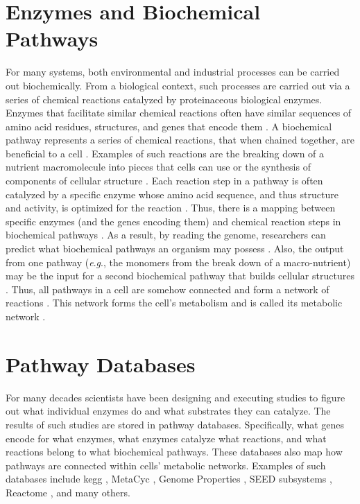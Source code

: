 \section{Enzymes and Biochemical Pathways} \label{enzymes-and-pathways} 

For many systems, both environmental and industrial processes can be carried out 
biochemically. From a biological context, such processes are carried out via a 
series of chemical reactions catalyzed by proteinaceous biological enzymes. 
Enzymes that facilitate similar chemical reactions often have similar sequences 
of amino acid residues, structures, and genes that encode them 
\cite{galperin1998analogous,zhang2003evolution}. A biochemical 
pathway represents a series of chemical reactions, that when chained together, 
are beneficial to a cell \cite{michal2012biochemical}. Examples of such 
reactions are the breaking down of a nutrient macromolecule into pieces that 
cells can use or the synthesis of components of cellular structure 
\cite{wagner2012metabolic}. Each reaction step in a pathway is often 
\cite{keller2015widespread,tawfik2010enzyme} catalyzed by a specific enzyme 
whose amino acid sequence, and thus structure and activity, is optimized for the 
reaction \cite{michal2012biochemical,zhang2003evolution,fersht1999structure}. 
Thus, there is a mapping between specific enzymes (and the genes encoding them) 
and chemical reaction steps in biochemical pathways \cite{thiele2010protocol}. 
As a result, by reading the genome, researchers can predict what biochemical 
pathways an organism may possess 
\cite{abubucker2012metabolic,thiele2010protocol}. Also, the output from one 
pathway (\textit{e}.\textit{g}., the monomers from the break down of a 
macro-nutrient) may be the input for a second biochemical pathway that builds 
cellular structures \cite{wagner2012metabolic,stelling2002metabolic}. Thus, all 
pathways in a cell are somehow connected and form a network of reactions 
\cite{wagner2012metabolic,stelling2002metabolic}. This network forms the cell's 
metabolism and is called its metabolic network \cite{wagner2012metabolic}.

\section{Pathway Databases} \label{pathway-databases}

For many decades scientists have been designing and executing studies to figure 
out what individual enzymes do and what substrates they can catalyze. The 
results of such studies are stored in pathway databases. Specifically, what 
genes encode for what enzymes, what enzymes catalyze what reactions, and what 
reactions belong to what biochemical pathways. These databases also map how 
pathways are connected within cells' metabolic networks. Examples of such 
databases include \gls{kegg} \cite{kanehisa2000kegg}, MetaCyc 
\cite{karp2002metacyc}, Genome Properties \cite{richardson2018genome}, SEED 
subsystems \cite{overbeek2005subsystems}, Reactome \cite{croft2013reactome}, and 
many others.

